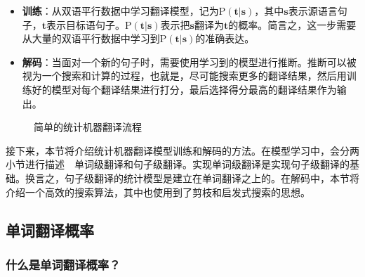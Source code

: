 \begin{itemize}
\vspace{0.5em}
\item {\small\sffamily\bfseries{训练}}：从双语平行数据中学习翻译模型，记为$\textrm{P}(\mathbf{t}|\mathbf{s})$，其中$\mathbf{s}$表示源语言句子，$\mathbf{t}$表示目标语句子。$\textrm{P}(\mathbf{t}|\mathbf{s})$表示把$\mathbf{s}$翻译为$\mathbf{t}$的概率。简言之，这一步需要从大量的双语平行数据中学习到$\textrm{P}(\mathbf{t}|\mathbf{s})$的准确表达。
\vspace{0.5em}
\item {\small\sffamily\bfseries{解码}}：当面对一个新的句子时，需要使用学习到的模型进行推断。推断可以被视为一个搜索和计算的过程，也就是，尽可能搜索更多的翻译结果，然后用训练好的模型对每个翻译结果进行打分，最后选择得分最高的翻译结果作为输出。
\vspace{0.5em}
\end{itemize}

\begin{figure}[htp]
    \centering

    \caption{简单的统计机器翻译流程}
    \label{fig:3-5}
\end{figure}
\vspace{-0.5em}

\parinterval 接下来，本节将介绍统计机器翻译模型训练和解码的方法。在模型学习中，会分两小节进行描述\ \dash \ 单词级翻译和句子级翻译。实现单词级翻译是实现句子级翻译的基础。换言之，句子级翻译的统计模型是建立在单词翻译之上的。在解码中，本节将介绍一个高效的搜索算法，其中也使用到了剪枝和启发式搜索的思想。


\subsection{单词翻译概率}\label{chapter3.2.3}


\subsubsection{什么是单词翻译概率？}

